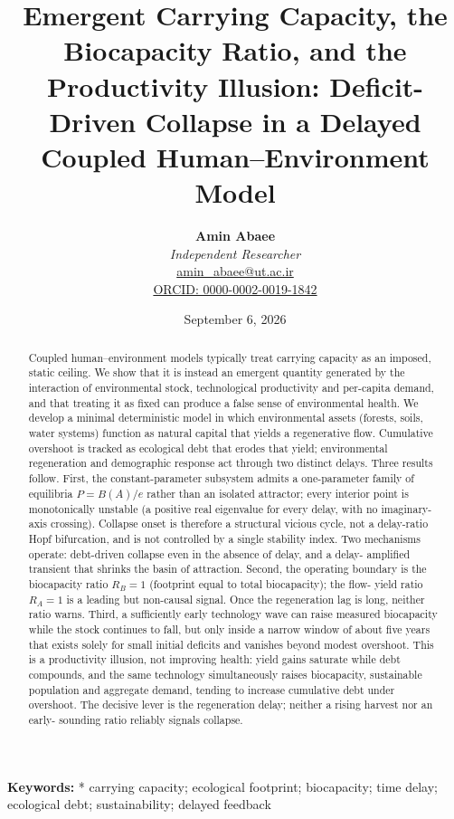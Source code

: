 \documentclass[11pt]{article}
\title{Emergent Carrying Capacity, the Biocapacity Ratio, and the Productivity Illusion: Deficit-Driven Collapse in a Delayed Coupled Human–Environment Model}
\author{
  \textbf{Amin Abaee}\\
  \textit{Independent Researcher}\\
  \href{mailto:amin_abaee@ut.ac.ir}{amin\_abaee@ut.ac.ir}\\
  \href{https://orcid.org/0000-0002-0019-1842}{ORCID: 0000-0002-0019-1842}
}
\date{September 6, 2026}
\begin{document}
\maketitle

\begin{abstract}
Coupled human–environment models typically treat carrying capacity as an imposed, static ceiling. We show that it is instead an emergent quantity generated by the interaction of environmental stock, technological productivity and per-capita demand, and that treating it as fixed can produce a false sense of environmental health. We develop a minimal deterministic model in which environmental assets (forests, soils, water systems) function as natural capital that yields a regenerative flow. Cumulative overshoot is tracked as ecological debt that erodes that yield; environmental regeneration and demographic response act through two distinct delays. Three results follow. First, the constant-parameter subsystem admits a one-parameter family of equilibria $P = B(A)/e$ rather than an isolated attractor; every interior point is monotonically unstable (a positive real eigenvalue for every delay, with no imaginary-axis crossing). Collapse onset is therefore a structural vicious cycle, not a delay-ratio Hopf bifurcation, and is not controlled by a single stability index. Two mechanisms operate: debt-driven collapse even in the absence of delay, and a delay- amplified transient that shrinks the basin of attraction. Second, the operating boundary is the biocapacity ratio $R_{B} = 1$ (footprint equal to total biocapacity); the flow- yield ratio $R_{A} = 1$ is a leading but non-causal signal. Once the regeneration lag is long, neither ratio warns. Third, a sufficiently early technology wave can raise measured biocapacity while the stock continues to fall, but only inside a narrow window of about five years that exists solely for small initial deficits and vanishes beyond modest overshoot. This is a productivity illusion, not improving health: yield gains saturate while debt compounds, and the same technology simultaneously raises biocapacity, sustainable population and aggregate demand, tending to increase cumulative debt under overshoot. The decisive lever is the regeneration delay; neither a rising harvest nor an early- sounding ratio reliably signals collapse.
\end{abstract}

\noindent\textbf{Keywords: }* carrying capacity; ecological footprint; biocapacity; time delay; ecological debt; sustainability; delayed feedback
\end{document}
